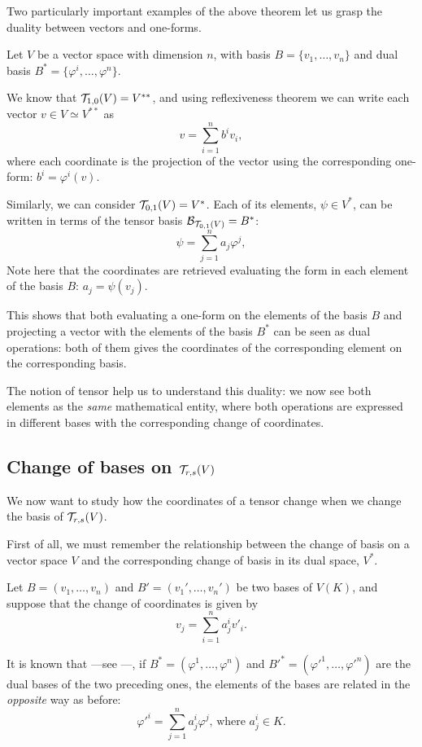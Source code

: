 Two particularly important examples of the above theorem let us grasp the duality between vectors and one-forms.

Let $V$ be a vector space with dimension $n$, with basis $B = \{v_1, \dots, v_n\}$ and dual basis $B^* = \{\varphi^i, \dots, \varphi^n\}$.

We know that ${\mathcal T}_{1,0}(V) = V^{**}$, and using reflexiveness theorem we can write each vector $v \in V \simeq V^{**}$ as
\[
v = \sum_{i=1}^n b^i v_i,
\]
where each coordinate is the projection of the vector using the corresponding one-form: $b^i = \varphi^i(v)$.

Similarly, we can consider ${\mathcal T}_{0,1}(V) = V^*$. Each of its elements, $\psi \in V^*$, can be written in terms of the tensor basis $\mathcal{B}_{{\mathcal T}_{0,1}(V)} = B^*$:
\[
	\psi = \sum_{j=1}^n a_j \varphi^j,
\]
Note here that the coordinates are retrieved evaluating the form in each element of the basis $B$: $a_j = \psi(v_j)$.

This shows that both evaluating a one-form on the elements of the basis $B$ and projecting a vector with the elements of the basis $B^*$ can be seen as dual operations: both of them gives the coordinates of the corresponding element on the corresponding basis.

The notion of tensor help us to understand this duality: we now see both elements as the \emph{same} mathematical entity, where both operations are expressed in different bases with the corresponding change of coordinates.

\subsection{Change of bases on ${\mathcal T}_{r,s}(V)$}

We now want to study how the coordinates of a tensor change when we change the basis of ${\mathcal T}_{r,s}(V)$.

First of all, we must remember the relationship between the change of basis on a vector space $V$ and the corresponding change of basis in its dual space, $V^*$.

Let $B = (v_1, \dots, v_n)$ and $B' = (v_1', \dots, v_n')$ be two bases of $V(K)$, and suppose that the change of coordinates is given by
\[
v_j = \sum_{i=1}^n a_j^i v'_i.
\]

It is known that ---see \cite[p. 162]{romero86}---, if $B^* = (\varphi^1, \dots, \varphi^n)$ and $B'^* = (\varphi'^1, \dots, \varphi'^n)$ are the dual bases of the two preceding ones, the elements of the bases are related in the \emph{opposite} way as before:
\begin{equation}
	\label{eq:changeV*}
	\varphi'^i = \sum_{j=1}^n a_j^i \varphi^j \textrm{, where } a_j^i \in K.
\end{equation}

